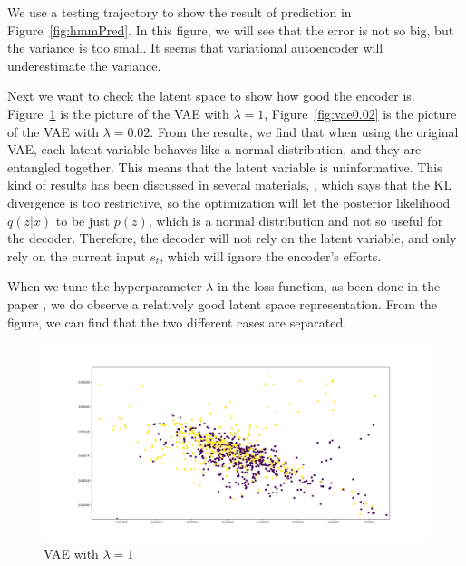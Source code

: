 \documentclass[conference]{IEEEtran}
\begin{document}
We use a testing trajectory to show the result of prediction in Figure~\ref{fig:hmmPred}. In this figure, we will see that the error is not so big, but the variance is too small. It seems that variational autoencoder will underestimate the variance.

Next we want to check the latent space to show how good the encoder is. Figure~\ref{fig:vae1} is the picture of the VAE with $\lambda = 1$, Figure~\ref{fig:vae0.02} is the picture of the VAE with $\lambda = 0.02$. From the results, we find that when using the original VAE, each latent variable behaves like a normal distribution, and they are entangled together. This means that the latent variable is uninformative. This kind of results has been discussed in several materials, \cite{ref:16,ref:17,ref:18,ref:19}, which says that the KL divergence is too restrictive, so the optimization will let the posterior likelihood $q(z | x)$ to be just $p(z)$, which is a normal distribution and not so useful for the decoder. Therefore, the decoder will not rely on the latent variable, and only rely on the current input $s_{t}$, which will ignore the encoder's efforts. 

When we tune the hyperparameter $\lambda$ in the loss function, as been done in the paper \cite{ref:8}, we do observe a relatively good latent space representation. From the figure, we can find that the two different cases are separated.

\begin{figure}[h]
	\centering
	\includegraphics[scale = 0.17]{vae_z_2.png}
	\caption{VAE with $\lambda=1$}
	\label{fig:vae1}
\end{figure}
\end{document}
